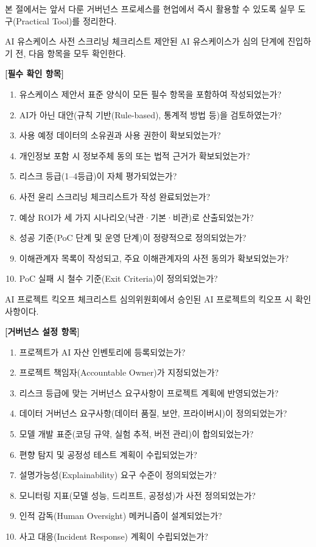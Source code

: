 본 절에서는 앞서 다룬 거버넌스 프로세스를 현업에서 즉시 활용할 수 있도록 실무 도구(Practical Tool)를 정리한다.

\begin{practicaltool}{AI 유스케이스 사전 스크리닝 체크리스트}
제안된 AI 유스케이스가 심의 단계에 진입하기 전, 다음 항목을 모두 확인한다.

\textbf{[필수 확인 항목]}
\begin{enumerate}
    \item 유스케이스 제안서 표준 양식이 모든 필수 항목을 포함하여 작성되었는가?
    \item AI가 아닌 대안(규칙 기반(Rule-based), 통계적 방법 등)을 검토하였는가?
    \item 사용 예정 데이터의 소유권과 사용 권한이 확보되었는가?
    \item 개인정보 포함 시 정보주체 동의 또는 법적 근거가 확보되었는가?
    \item 리스크 등급(1--4등급)이 자체 평가되었는가?
    \item 사전 윤리 스크리닝 체크리스트가 작성 완료되었는가?
    \item 예상 ROI가 세 가지 시나리오(낙관·기본·비관)로 산출되었는가?
    \item 성공 기준(PoC 단계 및 운영 단계)이 정량적으로 정의되었는가?
    \item 이해관계자 목록이 작성되고, 주요 이해관계자의 사전 동의가 확보되었는가?
    \item PoC 실패 시 철수 기준(Exit Criteria)이 정의되었는가?
\end{enumerate}
\end{practicaltool}

\begin{practicaltool}{AI 프로젝트 킥오프 체크리스트}
심의위원회에서 승인된 AI 프로젝트의 킥오프 시 확인 사항이다.

\textbf{[거버넌스 설정 항목]}
\begin{enumerate}
    \item 프로젝트가 AI 자산 인벤토리에 등록되었는가?
    \item 프로젝트 책임자(Accountable Owner)가 지정되었는가?
    \item 리스크 등급에 맞는 거버넌스 요구사항이 프로젝트 계획에 반영되었는가?
    \item 데이터 거버넌스 요구사항(데이터 품질, 보안, 프라이버시)이 정의되었는가?
    \item 모델 개발 표준(코딩 규약, 실험 추적, 버전 관리)이 합의되었는가?
    \item 편향 탐지 및 공정성 테스트 계획이 수립되었는가?
    \item 설명가능성(Explainability) 요구 수준이 정의되었는가?
    \item 모니터링 지표(모델 성능, 드리프트, 공정성)가 사전 정의되었는가?
    \item 인적 감독(Human Oversight) 메커니즘이 설계되었는가?
    \item 사고 대응(Incident Response) 계획이 수립되었는가?
\end{enumerate}
\end{practicaltool}


